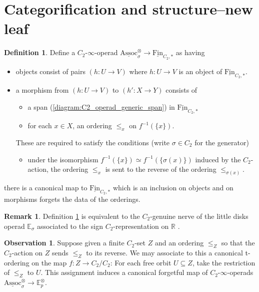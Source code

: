 \documentclass{article}
\newcommand{\RR}{\mathbb{R}}
\newcommand{\EE}{\mathbb{E}}
\newcommand{\Assoc}{\mathrm{Assoc}}
\theoremstyle{definition}
\newtheorem{definition}[equation]{Definition}
\newtheorem{remark}[equation]{Remark}
\newtheorem{observation}[equation]{Observation}
\begin{document}
\section{Categorification and structure--new leaf}
\begin{definition}\label{defn:gen_alg_inv_param_operad}
    Define a $ C_2 $-$ \infty $-operad $ \underline{\Assoc}_{\sigma}^\otimes \to \underline{\mathrm{Fin}}_{C_2, *} $ as having 
    \begin{itemize}
        \item objects consist of pairs $ (h : U \to V) $ where $ h: U \to V $ is an object of $ \underline{\mathrm{Fin}}_{C_2, *} $.  
        \item a morphism from $ (h : U \to V) $ to $ (h' : X \to Y) $ consists of 
        \begin{itemize}
            \item a span (\ref{diagram:C2_operad_generic_span}) in $ \underline{\mathrm{Fin}}_{C_2, *} $
            \item for each $ x \in X $, an ordering $ \leq_x $ on $ f^{-1}(\{x\}) $.  
        \end{itemize} 
        These are required to satisfy the conditions (write $ \sigma \in C_2 $ for the generator)
        \begin{itemize}
            \item under the isomorphism $ f^{-1}(\{x\}) \simeq f^{-1}(\{\sigma(x)\}) $ induced by the $ C_2 $-action, the ordering $ \leq_x $ is sent to the reverse of the ordering $ \leq_{\sigma(x)} $.  
        \end{itemize}
    \end{itemize}
    there is a canonical map to $ \underline{\mathrm{Fin}}_{C_2, *} $ which is an inclusion on objects and on morphisms forgets the data of the orderings. 
\end{definition}
\begin{remark}
    Definition \ref{defn:gen_alg_inv_param_operad} is equivalent to the $ C_2 $-genuine nerve of the little disks operad $ \EE_\sigma $ associated to the sign $ C_2 $-representation on $ \RR $ \cite[Example 3.9.4]{Horev19}. 
\end{remark}
\begin{observation}
    Suppose given a finite $ C_2 $-set $ Z $ and an ordering $ \leq_Z $ so that the $ C_2 $-action on $ Z $ sends $ \leq_Z $ to its reverse. 
    We may associate to this a canonical t-ordering on the map $ f \colon Z \to C_2/C_2 $: For each free orbit $ U \subseteq Z $, take the restriction of $ \leq_Z $ to $ U $. 
    This assignment induces a canonical forgetful map of $ C_2 $-$ \infty $-operads $ \underline{\Assoc}_\sigma^\otimes \to \EE_p^\otimes $.  
\end{observation}
\end{document}
